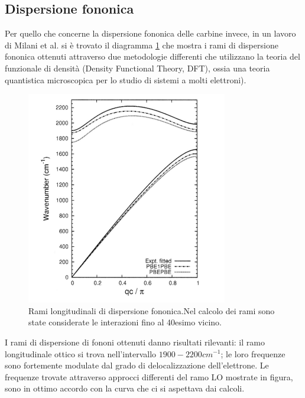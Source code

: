 \documentclass[a4paper,titlepage]{book}
\begin{document}
\subsection{Dispersione fononica}
Per quello che concerne la dispersione fononica delle carbine invece, in un lavoro di Milani et al. \cite{phono} si è trovato il diagramma \ref{fig:ccc} che mostra i rami di dispersione fononica  ottenuti attraverso due metodologie differenti che utilizzano la teoria del funzionale di densità (Density Functional Theory, DFT), ossia una teoria quantistica microscopica per lo studio di sistemi a molti elettroni).
\begin{figure}[h!] 
	\centering \includegraphics[width=0.6\columnwidth]{phocarb.png}
	\caption{
		Rami longitudinali di dispersione fononica.Nel calcolo dei rami sono state considerate le interazioni fino al 40esimo vicino.
	}
	\label{fig:ccc}
\end{figure}

I rami di dispersione di fononi ottenuti danno risultati rilevanti: il ramo longitudinale ottico si trova nell'intervallo $1900-2200 cm^{-1}$; le loro frequenze sono fortemente modulate dal grado di delocalizzazione dell'elettrone. Le frequenze trovate attraverso approcci differenti del ramo LO mostrate in figura, sono in ottimo accordo con la curva che ci si aspettava dai calcoli. 
\end{document}
